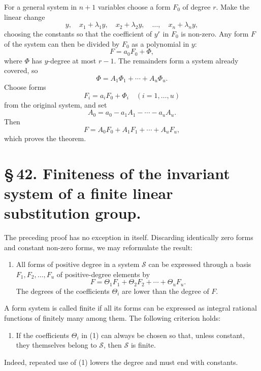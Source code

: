 \documentclass[11pt]{article}
\begin{document}
For a general system in $n+1$ variables choose a form $F_0$ of degree $r$. Make the linear change
\begin{equation}
y,
\quad x_1+\lambda_1y,
\quad x_2+\lambda_2y,
\quad\ldots,
\quad x_n+\lambda_ny,
\tag{10}
\end{equation}
choosing the constants so that the coefficient of $y^r$ in $F_0$ is non-zero. Any form $F$ of the system can then be divided by $F_0$ as a polynomial in $y$:
\begin{equation}
F=a_0F_0+\Phi,
\tag{11}
\end{equation}
where $\Phi$ has $y$-degree at most $r-1$. The remainders form a system already covered, so
\begin{equation}
\Phi=A_1\Phi_1+\cdots+A_u\Phi_u.
\tag{12}
\end{equation}
Choose forms
\begin{equation}
F_i=a_iF_0+\Phi_i
\quad(i=1,\ldots,u)
\tag{13}
\end{equation}
from the original system, and set
\begin{equation}
A_0=a_0-a_1A_1-\cdots-a_uA_u.
\tag{14}
\end{equation}
Then
\begin{equation}
F=A_0F_0+A_1F_1+\cdots+A_uF_u,
\tag{15}
\end{equation}
which proves the theorem.

\section*{\S\,42. Finiteness of the invariant system of a finite linear substitution group.}

The preceding proof has no exception in itself. Discarding identically zero forms and constant non-zero forms, we may reformulate the result:
\begin{enumerate}[label=\Roman*.,leftmargin=2.4em,start=2]
\item All forms of positive degree in a system $\mathcal S$ can be expressed through a basis $F_1,F_2,\ldots,F_u$ of positive-degree elements by
\begin{equation}
F=\Theta_1F_1+\Theta_2F_2+\cdots+\Theta_uF_u.
\tag{1}
\end{equation}
The degrees of the coefficients $\Theta_i$ are lower than the degree of $F$.
\end{enumerate}
A form system is called finite if all its forms can be expressed as integral rational functions of finitely many among them. The following criterion holds:
\begin{enumerate}[label=\Roman*.,leftmargin=2.4em,start=3]
\item If the coefficients $\Theta_i$ in (1) can always be chosen so that, unless constant, they themselves belong to $\mathcal S$, then $\mathcal S$ is finite.
\end{enumerate}
Indeed, repeated use of (1) lowers the degree and must end with constants.
\end{document}
